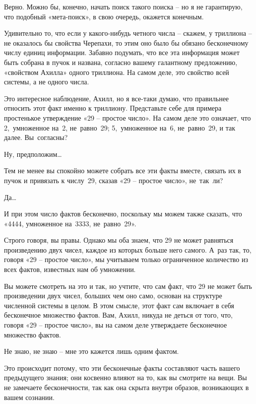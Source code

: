 \documentclass[../main.tex]{subfiles}
\begin{document}
\begin{dialogue}
 Верно. Можно бы, конечно, начать поиск такого поиска \--- но я не гарантирую, что подобный «мета-поиск», в свою очередь, окажется конечным.

 Удивительно то, что если у какого-нибудь четного числа \--- скажем, у триллиона \--- не оказалось бы свойства Черепахи, то этим оно было бы обязано бесконечному числу единиц информации. Забавно подумать, что все эта информация может быть собрана в пучок и названа, согласно вашему галантному предложению, «свойством Ахилла» одного триллиона. На самом деле, это свойство всей системы, а не одного числа.

 Это интересное наблюдение, Ахилл, но я все-таки думаю, что правильнее относить этот факт именно к триллиону. Представьте себе для примера простенькое утверждение «29 \--- простое число». На самом деле это означает, что 2,~умноженное на~2, не~равно~29; 5,~умноженное на~6, не~равно~29, и так далее. Вы~согласны?

 Ну, предположим\ldots{}

 Тем не менее вы спокойно можете собрать все эти факты вместе, связать их в пучок и привязать к числу~29, сказав «29 \--- простое число», не~так~ли?

 Да\ldots{}

 И при этом число фактов бесконечно, поскольку мы можем также сказать, что «4444, умноженное на~3333, не~равно~29».

 Строго говоря, вы правы. Однако мы оба знаем, что 29 не может равняться произведению двух чисел, каждое из которых больше него самого. А~раз так, то, говоря «29 \--- простое число», мы учитываем только ограниченное количество из всех фактов, известных нам об умножении.

 Вы можете смотреть на это и так, но учтите, что сам факт, что 29 не может быть произведении двух чисел, больших чем оно само, основан на структуре численной системы в целом. В этом смысле, этот факт сам включает в себя бесконечное множество фактов. Вам, Ахилл, никуда не деться от того, что, говоря «29 \--- простое число», вы на самом деле утверждаете бесконечное множество фактов.

 Не знаю, не знаю \--- мне это кажется лишь одним фактом.

 Это происходит потому, что эти бесконечные факты составляют часть вашего предыдущего знания; они косвенно влияют на то, как вы смотрите на вещи. Вы не замечаете бесконечности, так как она скрыта внутри образов, возникающих в вашем сознании.


\end{dialogue}
\end{document}

